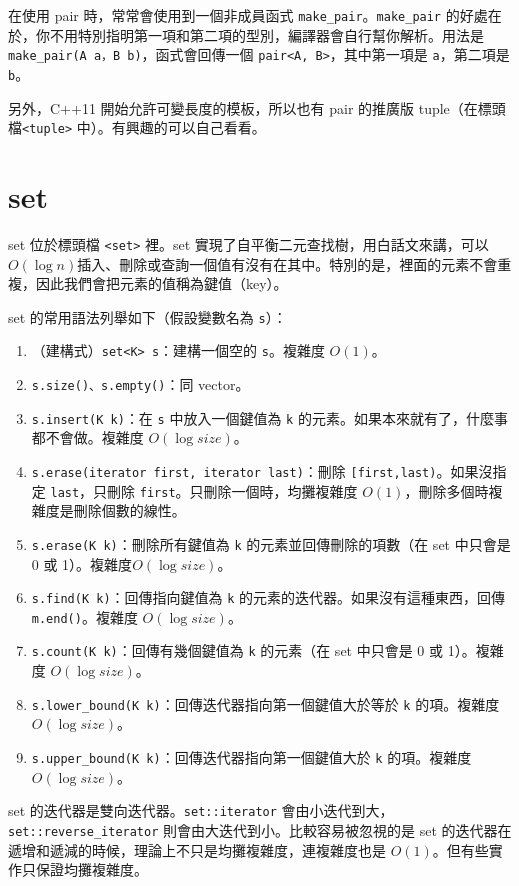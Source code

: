 \documentclass[a4paper, 11pt, oneside]{book}
\begin{document}
在使用 pair 時，常常會使用到一個非成員函式 \texttt{make\_pair}。\texttt{make\_pair} 的好處在於，你不用特別指明第一項和第二項的型別，編譯器會自行幫你解析。用法是 \texttt{make\_pair(A a，B b)}，函式會回傳一個 \texttt{pair<A, B>}，其中第一項是 \texttt{a}，第二項是 \texttt{b}。

另外，C++11 開始允許可變長度的模板，所以也有 pair 的推廣版 tuple（在標頭檔\texttt{<tuple>} 中）。有興趣的可以自己看看。

\section{set}

set 位於標頭檔 \texttt{<set>} 裡。set 實現了自平衡二元查找樹，用白話文來講，可以 $O(\log n)$插入、刪除或查詢一個值有沒有在其中。特別的是，裡面的元素不會重複，因此我們會把元素的值稱為鍵值（key）。

set 的常用語法列舉如下（假設變數名為 \texttt{s}）：
\begin{enumerate}
    \item （建構式）\texttt{set<K> s}：建構一個空的 \texttt{s}。複雜度 $O(1)$。
    \item \texttt{s.size()、s.empty()}：同 vector。
    \item \texttt{s.insert(K k)}：在 \texttt{s} 中放入一個鍵值為 \texttt{k} 的元素。如果本來就有了，什麼事都不會做。複雜度 $O(\log size)$。
    \item \texttt{s.erase(iterator first, iterator last)}：刪除 \texttt{[first,last)}。如果沒指定 \texttt{last}，只刪除 \texttt{first}。只刪除一個時，均攤複雜度 $O(1)$，刪除多個時複雜度是刪除個數的線性。
    \item \texttt{s.erase(K k)}：刪除所有鍵值為 \texttt{k} 的元素並回傳刪除的項數（在 set 中只會是 0 或 1）。複雜度$O(\log size)$。
    \item \texttt{s.find(K k)}：回傳指向鍵值為 \texttt{k} 的元素的迭代器。如果沒有這種東西，回傳 \texttt{m.end()}。複雜度 $O(\log size)$。
    \item \texttt{s.count(K k)}：回傳有幾個鍵值為 \texttt{k} 的元素（在 set 中只會是 0 或 1）。複雜度 $O(\log size)$。
    \item \texttt{s.lower\_bound(K k)}：回傳迭代器指向第一個鍵值大於等於 \texttt{k} 的項。複雜度 $O(\log size)$。
    \item \texttt{s.upper\_bound(K k)}：回傳迭代器指向第一個鍵值大於 \texttt{k} 的項。複雜度 $O(\log size)$。
\end{enumerate}

set 的迭代器是雙向迭代器。\texttt{set::iterator} 會由小迭代到大，\texttt{set::reverse\_iterator} 則會由大迭代到小。比較容易被忽視的是 set 的迭代器在遞增和遞減的時候，理論上不只是均攤複雜度，連複雜度也是 $O(1)$。但有些實作只保證均攤複雜度。
\end{document}
